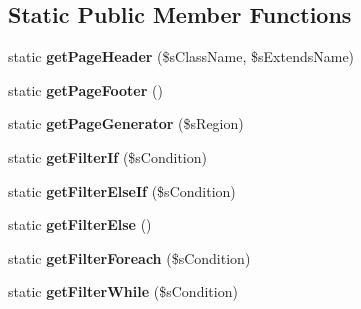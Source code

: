 \subsection*{Static Public Member Functions}
\begin{DoxyCompactItemize}
\item 
\hypertarget{class_i_p_c_o___parser_settings_aba6deb8bb85cb4639b931b43b05ff075}{static {\bfseries get\-Page\-Header} (\$s\-Class\-Name, \$s\-Extends\-Name)}\label{class_i_p_c_o___parser_settings_aba6deb8bb85cb4639b931b43b05ff075}

\item 
\hypertarget{class_i_p_c_o___parser_settings_a694821d87a95bc43ef65ff89f6a28ecb}{static {\bfseries get\-Page\-Footer} ()}\label{class_i_p_c_o___parser_settings_a694821d87a95bc43ef65ff89f6a28ecb}

\item 
\hypertarget{class_i_p_c_o___parser_settings_a1ea9ca3dc24962a75efb15515218e82a}{static {\bfseries get\-Page\-Generator} (\$s\-Region)}\label{class_i_p_c_o___parser_settings_a1ea9ca3dc24962a75efb15515218e82a}

\item 
\hypertarget{class_i_p_c_o___parser_settings_a00100b88477fd790dc32510ad779eb6c}{static {\bfseries get\-Filter\-If} (\$s\-Condition)}\label{class_i_p_c_o___parser_settings_a00100b88477fd790dc32510ad779eb6c}

\item 
\hypertarget{class_i_p_c_o___parser_settings_af31cc0a5e2371b9fb476bd50949dab52}{static {\bfseries get\-Filter\-Else\-If} (\$s\-Condition)}\label{class_i_p_c_o___parser_settings_af31cc0a5e2371b9fb476bd50949dab52}

\item 
\hypertarget{class_i_p_c_o___parser_settings_aca3bb54ec3b04e318c277d2b0e075bca}{static {\bfseries get\-Filter\-Else} ()}\label{class_i_p_c_o___parser_settings_aca3bb54ec3b04e318c277d2b0e075bca}

\item 
\hypertarget{class_i_p_c_o___parser_settings_a8fa3c80b17829057d81c1530b5c917e6}{static {\bfseries get\-Filter\-Foreach} (\$s\-Condition)}\label{class_i_p_c_o___parser_settings_a8fa3c80b17829057d81c1530b5c917e6}

\item 
\hypertarget{class_i_p_c_o___parser_settings_abc05b2bba2630cdf62f6a9d8e714685b}{static {\bfseries get\-Filter\-While} (\$s\-Condition)}\label{class_i_p_c_o___parser_settings_abc05b2bba2630cdf62f6a9d8e714685b}


\end{DoxyCompactItemize}

